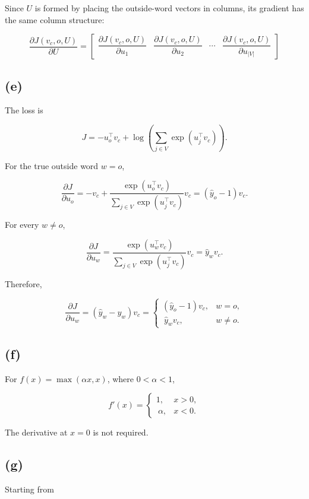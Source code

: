 \documentclass[a4paper,10pt]{article}
\begin{document}
Since \(U\) is formed by placing the outside-word vectors in columns, its gradient has the same column structure:

\[
\frac{\partial J(v_c,o,U)}{\partial U}= \begin{bmatrix} \dfrac{\partial J(v_c,o,U)}{\partial u_1} & \dfrac{\partial J(v_c,o,U)}{\partial u_2} & \cdots & \dfrac{\partial J(v_c,o,U)}{\partial u_{\lvert V\rvert}} \end{bmatrix}
\]

\subsection{(e)}\label{e}

The loss is

\[
J=-u_o^\top v_c+\log\left(\sum_{j\in V}\exp(u_j^\top v_c)\right).
\]

For the true outside word \(w=o\),

\[
\frac{\partial J}{\partial u_o} =-v_c+\frac{\exp(u_o^\top v_c)}{\sum_{j\in V}\exp(u_j^\top v_c)}v_c =(\hat{y}_o-1)v_c.
\]

For every \(w\neq o\),

\[
\frac{\partial J}{\partial u_w} =\frac{\exp(u_w^\top v_c)}{\sum_{j\in V}\exp(u_j^\top v_c)}v_c =\hat{y}_w v_c.
\]

Therefore,

\[
\frac{\partial J}{\partial u_w} =(\hat{y}_w-y_w)v_c= \begin{cases} (\hat{y}_o-1)v_c, & w=o,\\\ \hat{y}_w v_c, & w\neq o. \end{cases}
\]

\subsection{(f)}\label{f}

For \(f(x)=\max(\alpha x,x)\), where \(0<\alpha<1\),

\[
f'(x)= \begin{cases} 1, & x>0,\\\ \alpha, & x<0. \end{cases}
\]

The derivative at \(x=0\) is not required.

\subsection{(g)}\label{g}

Starting from
\end{document}
